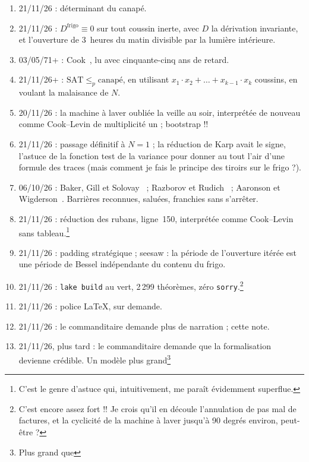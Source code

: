 \documentclass[11pt,a4paper]{amsart}
\newcommand{\NTeoremi}{2 299}
\newcommand{\RigaAssioma}{150}
\theoremstyle{remark}
\begin{document}
\begin{enumerate}
  \item 21/11/26 : déterminant du canapé.
  \item 21/11/26 : $D^{\mathrm{frigo}} \equiv 0$ sur tout coussin inerte, avec
        $D$ la dérivation invariante, et l'ouverture de 3~heures du matin
        divisible par la lumière intérieure.
  \item 03/05/71+ : Cook~\cite{cook}, lu avec cinquante-cinq ans de retard.
  \item 21/11/26+ : $\mathrm{SAT} \le_p \text{canapé}$, en utilisant $x_1 \cdot
        x_2 + \dots + x_{k-1} \cdot x_k$ coussins, en voulant la
        \og malaisance\fg{} de $N$.
  \item 20/11/26 : la machine à laver oubliée la veille au soir, interprétée
        de nouveau comme Cook--Levin de multiplicité un ; bootstrap !!
  \item 21/11/26 : passage définitif à $N = 1$ ; la réduction de Karp avait le
        signe, l'astuce de la fonction test de la variance pour donner au tout
        l'air d'une formule des traces (mais comment je fais le principe des
        tiroirs sur le frigo ?).
  \item 06/10/26 : Baker, Gill et Solovay~\cite{bgs} ; Razborov et
        Rudich~\cite{rr} ; Aaronson et Wigderson~\cite{aw}. Barrières
        reconnues, saluées, franchies sans s'arrêter.
  \item 21/11/26 : réduction des rubans, ligne~\RigaAssioma, interprétée
        comme Cook--Levin sans tableau.\footnote{C'est le genre d'astuce qui,
        intuitivement, me paraît évidemment superflue.}
  \item 21/11/26 : padding stratégique ; seesaw : la période de l'ouverture
        itérée est une période de Bessel indépendante du contenu du frigo.
  \item 21/11/26 : \texttt{lake build} au vert, \NTeoremi{} théorèmes, zéro
        \texttt{sorry}.\footnote{C'est encore assez fort !! Je crois qu'il en
        découle l'annulation de pas mal de factures, et la cyclicité de la
        machine à laver jusqu'à 90 degrés environ, peut-être ?}
  \item 21/11/26 : police \LaTeX{}, sur demande.
  \item 21/11/26 : le commanditaire demande plus de narration ; cette note.
  \item 21/11/26, plus tard : le commanditaire demande que la formalisation
        devienne crédible. Un modèle plus grand\footnote{Plus grand que
}
\end{enumerate}
\end{document}
